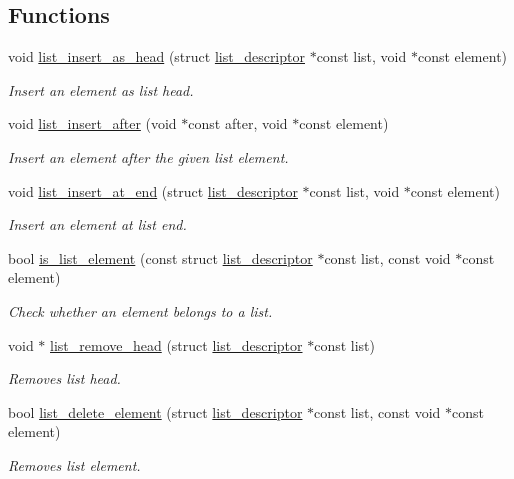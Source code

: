 \subsection*{Functions}
\begin{DoxyCompactItemize}
\item 
void \hyperlink{group__doc__driver__hal__utils__list_gafb3237f00dbf55a40075f3a42c49d32a}{list\+\_\+insert\+\_\+as\+\_\+head} (struct \hyperlink{structlist__descriptor}{list\+\_\+descriptor} $\ast$const list, void $\ast$const element)
\begin{DoxyCompactList}\small\item\em Insert an element as list head. \end{DoxyCompactList}\item 
void \hyperlink{group__doc__driver__hal__utils__list_ga55b8c083fa131f829b1c998e14352f34}{list\+\_\+insert\+\_\+after} (void $\ast$const after, void $\ast$const element)
\begin{DoxyCompactList}\small\item\em Insert an element after the given list element. \end{DoxyCompactList}\item 
void \hyperlink{group__doc__driver__hal__utils__list_ga48c5a1a13223944dd190a6a028075deb}{list\+\_\+insert\+\_\+at\+\_\+end} (struct \hyperlink{structlist__descriptor}{list\+\_\+descriptor} $\ast$const list, void $\ast$const element)
\begin{DoxyCompactList}\small\item\em Insert an element at list end. \end{DoxyCompactList}\item 
bool \hyperlink{group__doc__driver__hal__utils__list_ga26022c1362f0fa7e17b734262229c1a7}{is\+\_\+list\+\_\+element} (const struct \hyperlink{structlist__descriptor}{list\+\_\+descriptor} $\ast$const list, const void $\ast$const element)
\begin{DoxyCompactList}\small\item\em Check whether an element belongs to a list. \end{DoxyCompactList}\item 
void $\ast$ \hyperlink{group__doc__driver__hal__utils__list_ga2269db44f7013963f60c568dd8d08022}{list\+\_\+remove\+\_\+head} (struct \hyperlink{structlist__descriptor}{list\+\_\+descriptor} $\ast$const list)
\begin{DoxyCompactList}\small\item\em Removes list head. \end{DoxyCompactList}\item 
bool \hyperlink{group__doc__driver__hal__utils__list_gad5a2a1ff5dcdfadb47d4ba436e154c98}{list\+\_\+delete\+\_\+element} (struct \hyperlink{structlist__descriptor}{list\+\_\+descriptor} $\ast$const list, const void $\ast$const element)
\begin{DoxyCompactList}\small\item\em Removes list element. \end{DoxyCompactList}\end{DoxyCompactItemize}


